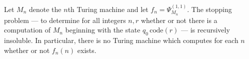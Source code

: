 Let $M_n$ denote the $n$th Turing machine and let $f_n = \Psi_{M_n}^{(1,1)}$. The stopping problem — to determine for all integers $n, r$ whether or not there is a computation of $M_n$ beginning with the state $q_0\,\text{code}(r)$ — is recursively insoluble. In particular, there is no Turing machine which computes for each $n$ whether or not $f_n(n)$ exists.
